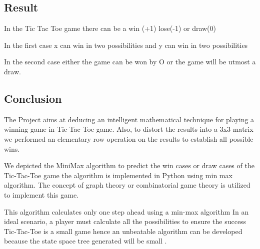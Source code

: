 \documentclass[a4paper, 12pt]{article}
\begin{document}
\newpage
\begin{center}
\section{Result}
\end{center}
 In the Tic Tac Toe game there can be a win (+1) lose(-1) or draw(0)

 In the first case x can win in two possibilities and y can win in two possibilities

 In the second case either the game can be won by O or the game will be utmost a draw.

\newpage
\begin{center}
\section{Conclusion}
\end{center}
The Project aims at deducing an intelligent mathematical technique for playing a winning game in Tic-Tac-Toe game. Also, to distort the results into a 3x3 matrix we performed an elementary row operation on the results to establish all possible wins.
\par
	We depicted the MiniMax algorithm to predict the win cases or draw cases of the Tic-Tac-Toe game the algorithm is implemented in Python using min max algorithm. The concept of graph theory or combinatorial game theory is utilized to implement this game. 
\par
This algorithm calculates only one step ahead using a min-max algorithm In an ideal scenario, a player must calculate all the possibilities to ensure the success Tic-Tac-Toe is a small game hence an unbeatable algorithm can be developed because the state space tree generated will be small .

\newpage
\begin{thebibliography}{1}

\end{thebibliography}
\end{document}
